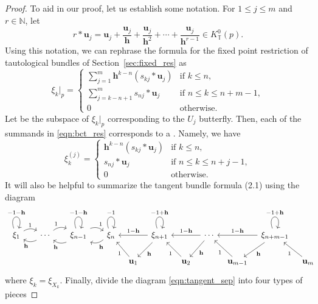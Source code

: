 \documentclass[11pt]{article}
\numberwithin{equation}{section}
\newcommand{\torus}{\mathbb T}
\newcommand{\NN}{\mathbb N}
\newcommand{\hb}{\mathbf h}
\newcommand{\ub}{\mathbf u}
\newcommand{\cdloop}[1]{\ar[loop, distance = 2em, out=110, in=70, "#1"]}
\begin{document}
\begin{proof}

To aid in our proof, let us establish some notation. For $1\leq j \leq m$ and $r\in\NN$, let
\[
r*\ub_j = \ub_j + \frac{\ub_j}{\hb} + \frac{\ub_j}{\hb^2} + \cdots + \frac{\ub_j}{\hb^{r-1}} \in K^0_\torus(p).
\]
Using this notation, we can rephrase the formula for the fixed point restriction of tautological bundles of Section~\ref{sec:fixed_res} as
\begin{equation}
\label{eqn:bct_res}
\xi_k|_p = \begin{cases}
\displaystyle\sum_{j=1}^m \hb^{k-n}(s_{kj}*\ub_j) & \text{if }k\leq n, \\
\displaystyle\sum_{j=k-n+1}^{m} s_{nj}*\ub_j & \text{if }n\leq k \leq n+m-1, \\
0 & \text{otherwise}.
\end{cases}
\end{equation}
Let  be the subspace of $\xi_k|_p$ corresponding to the $U_j$ butterfly. Then, each of the summands in \eqref{eqn:bct_res} corresponds to a . Namely, we have
\begin{equation}
\label{eqn:bct_res_bfly}
\xi_k^{(j)} = \begin{cases}
\hb^{k-n}(s_{kj}*\ub_j) & \text{if }k\leq n, \\
s_{nj}*\ub_j & \text{if }n\leq k \leq n+j-1, \\
0 & \text{otherwise}.
\end{cases}
\end{equation}
It will also be helpful to summarize the tangent bundle formula (2.1) using the diagram
\begin{equation}
\label{eqn:tangent_sep}
\begin{tikzcd}[column sep = 0.8em]
\xi_1 \ar[rr, bend left, "1"] \cdloop{-1-\hb}
&& \cdots \ar[ll, bend left, "\hb"] \ar[rr, bend left, "1"]
&& \xi_{n - 1} \ar[ll, bend left, "\hb"] \ar[rr, bend left, "1"] \cdloop{-1-\hb}
&& \xi_n \ar[ll, bend left, "\hb"] \cdloop{-1}
&& \xi_{n + 1} \ar[ll, swap, "1-\hb"] \cdloop{-1+\hb} \ar[ld, "\hb"]
&& \cdots \ar[ll, swap, "1-\hb"] \ar[ld, "\hb"]
&& \xi_{n+m-1} \ar[ll, swap, "1-\hb"] \cdloop{-1+\hb} \ar[ld, "\hb"]
\\
&&&&&&&
\ub_{1} \ar[lu, "1"]
&& \ub_{2} \ar[lu, "1"]
&& \ub_{{m-1}} \ar[lu, "1"]
&& \ub_{m} \ar[lu, "1"]
\end{tikzcd}\!\!\!\!\!
\end{equation}
where $\xi_k = \xi_{X_k}$. Finally, divide the diagram \eqref{eqn:tangent_sep} into four types of pieces


\end{proof}
\end{document}
